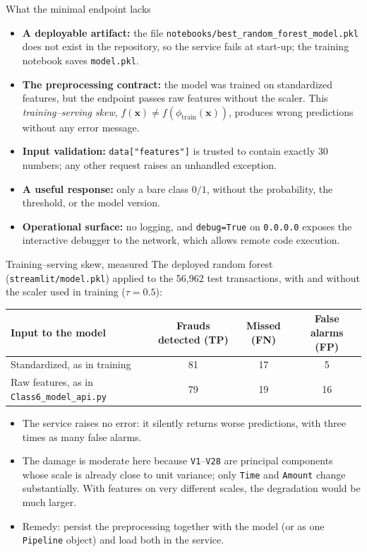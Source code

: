 \begin{frame}{What the minimal endpoint lacks}
\begin{itemize}
\item \textbf{A deployable artifact:} the file \texttt{notebooks/best\_random\_forest\_model.pkl} does not exist in the repository, so the service fails at start-up; the training notebook saves \texttt{model.pkl}.
\item \textbf{The preprocessing contract:} the model was trained on standardized features, but the endpoint passes raw features without the scaler. This \emph{training--serving skew}, $f(\mathbf{x}) \neq f(\phi_{\mathrm{train}}(\mathbf{x}))$, produces wrong predictions without any error message.
\item \textbf{Input validation:} \texttt{data["features"]} is trusted to contain exactly 30 numbers; any other request raises an unhandled exception.
\item \textbf{A useful response:} only a bare class $0/1$, without the probability, the threshold, or the model version.
\item \textbf{Operational surface:} no logging, and \texttt{debug=True} on \texttt{0.0.0.0} exposes the interactive debugger to the network, which allows remote code execution.
\end{itemize}
\coursefooter
\end{frame}

\begin{frame}{Training--serving skew, measured}
\begingroup\small
The deployed random forest (\texttt{streamlit/model.pkl}) applied to the 56{,}962 test transactions, with and without the scaler used in training ($\tau = 0.5$):
\par\endgroup
\vspace{0.5em}
\centering
\begingroup\footnotesize
\begin{tabular}{l c c c}
Input to the model & Frauds detected (TP) & Missed (FN) & False alarms (FP) \\
\toprule
Standardized, as in training & 81 & 17 & 5 \\
Raw features, as in \texttt{Class6\_model\_api.py} & 79 & 19 & 16 \\
\bottomrule
\end{tabular}
\par\endgroup
\vspace{0.6em}
\begin{itemize}\footnotesize
\item The service raises no error: it silently returns worse predictions, with three times as many false alarms.
\item The damage is moderate here because \texttt{V1}--\texttt{V28} are principal components whose scale is already close to unit variance; only \texttt{Time} and \texttt{Amount} change substantially. With features on very different scales, the degradation would be much larger.
\item Remedy: persist the preprocessing together with the model (or as one \texttt{Pipeline} object) and load both in the service.
\end{itemize}
\coursefooter
\end{frame}

